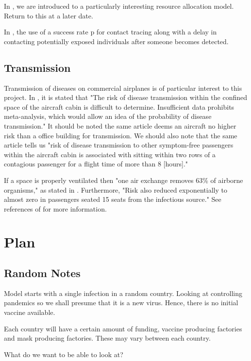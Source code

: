 \documentclass[a4paper,11pt]{article}
\theoremstyle{plain}
\theoremstyle{definition}
\begin{document}
In \citep{ControlFMRA}, we are introduced to a particularly interesting resource allocation model. Return to this at a later date.

In \citep{ModelContactTracing}, the use of a success rate p for contact tracing along with a delay in contacting potentially exposed individuals after someone becomes detected.

\subsection{Transmission}

Transmission of diseases on commercial airplanes is of particular interest to this project. In \citep{TransAirTravel}, it is stated that "The risk of disease transmission within the confined
space of the aircraft cabin is difficult to determine.
Insufficient data prohibits meta-analysis, which would
allow an idea of the probability of disease transmission." It should be noted the same article deems an aircraft no higher risk than a office building for transmission. We should also note that the same article tells us "risk of disease transmission to other
symptom-free passengers within the aircraft cabin is
associated with sitting within two rows of a contagious
passenger for a flight time of more than 8 [hours]."

If a space is properly ventilated then "one air exchange removes 63\%
of airborne organisms," as stated in \citep{TransAirTravel}. Furthermore, "Risk also reduced exponentially to
almost zero in passengers seated 15 seats from the
infectious source." See references of \citep{TransAirTravel} for more information.

\break

\section{Plan}

\subsection{Random Notes}
Model starts with a single infection in a random country. Looking at controlling pandemics so we shall presume that it is a new virus. Hence, there is no initial vaccine available.

Each country will have a certain amount of funding, vaccine producing factories and mask producing factories. These may vary between each country. 

What do we want to be able to look at?
\end{document}
